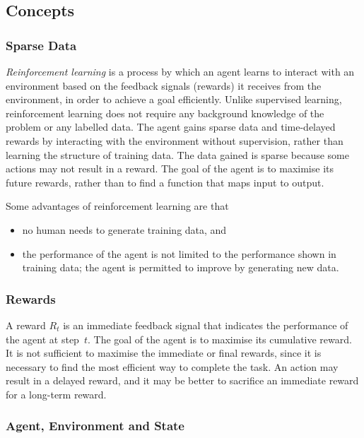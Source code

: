 ﻿\subsection{Concepts}

\subsubsection{Sparse Data}

\emph{Reinforcement learning} is a process by which an agent learns to interact with an environment based on the feedback signals (rewards) it receives from the environment, in order to achieve a goal efficiently.
Unlike supervised learning, reinforcement learning does not require any background knowledge of the problem or any labelled data.
The agent gains sparse data and time-delayed rewards by interacting with the environment without supervision, rather than learning the structure of training data.
The data gained is sparse because some actions may not result in a reward.
The goal of the agent is to maximise its future rewards, rather than to find a function that maps input to output.

Some advantages of reinforcement learning are that
\begin{itemize}
  \item no human needs to generate training data, and
  \item the performance of the agent is not limited to the performance shown in training data; the agent is permitted to improve by generating new data.
\end{itemize}

\subsubsection{Rewards}

A reward \( R_{t} \) is an immediate feedback signal that indicates the performance of the agent at step~\( t \).
The goal of the agent is to maximise its cumulative reward.
It is not sufficient to maximise the immediate or final rewards, since it is necessary to find the most efficient way to complete the task.
An action may result in a delayed reward, and it may be better to sacrifice an immediate reward for a long-term reward.

\subsubsection{Agent, Environment and State}

